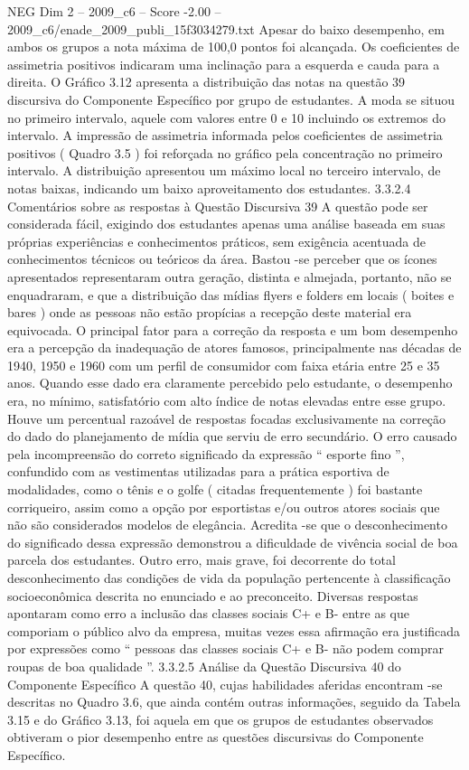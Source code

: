 \begin{textsample}{NEG Dim 2 – 2009\_c6 – Score -2.00 – 2009\_c6/enade\_2009\_publi\_15f3034279.txt}
Apesar do baixo desempenho, em ambos os grupos a nota máxima de 100,0 pontos foi alcançada.
Os coeficientes de assimetria positivos indicaram uma inclinação para a esquerda e cauda para a direita.
O Gráfico 3.12 apresenta a distribuição das notas na questão 39 discursiva do Componente Específico por grupo de estudantes.
A moda se situou no primeiro intervalo, aquele com valores entre 0 e 10 incluindo os extremos do intervalo.
A impressão de assimetria informada pelos coeficientes de assimetria positivos ( Quadro 3.5 ) foi reforçada no gráfico pela concentração no primeiro intervalo.
A distribuição apresentou um máximo local no terceiro intervalo, de notas baixas, indicando um baixo aproveitamento dos estudantes. 3.3.2.4 Comentários sobre as respostas à Questão Discursiva 39 A questão pode ser considerada fácil, exigindo dos estudantes apenas uma análise baseada em suas próprias experiências e conhecimentos práticos, sem exigência acentuada de conhecimentos técnicos ou teóricos da área.
Bastou -se perceber que os ícones apresentados representaram outra geração, distinta e almejada, portanto, não se enquadraram, e que a distribuição das mídias flyers e folders em locais ( boites e bares ) onde as pessoas não estão propícias a recepção deste material era equivocada.
O principal fator para a correção da resposta e um bom desempenho era a percepção da inadequação de atores famosos, principalmente nas décadas de 1940, 1950 e 1960 com um perfil de consumidor com faixa etária entre 25 e 35 anos.
Quando esse dado era claramente percebido pelo estudante, o desempenho era, no mínimo, satisfatório com alto índice de notas elevadas entre esse grupo.
Houve um percentual razoável de respostas focadas exclusivamente na correção do dado do planejamento de mídia que serviu de erro secundário.
O erro causado pela incompreensão do correto significado da expressão “ esporte fino ”, confundido com as vestimentas utilizadas para a prática esportiva de modalidades, como o tênis e o golfe ( citadas frequentemente ) foi bastante corriqueiro, assim como a opção por esportistas e/ou outros atores sociais que não são considerados modelos de elegância.
Acredita -se que o desconhecimento do significado dessa expressão demonstrou a dificuldade de vivência social de boa parcela dos estudantes.
Outro erro, mais grave, foi decorrente do total desconhecimento das condições de vida da população pertencente à classificação socioeconômica descrita no enunciado e ao preconceito.
Diversas respostas apontaram como erro a inclusão das classes sociais C+ e B- entre as que comporiam o público alvo da empresa, muitas vezes essa afirmação era justificada por expressões como “ pessoas das classes sociais C+ e B- não podem comprar roupas de boa qualidade ”. 3.3.2.5 Análise da Questão Discursiva 40 do Componente Específico A questão 40, cujas habilidades aferidas encontram -se descritas no Quadro 3.6, que ainda contém outras informações, seguido da Tabela 3.15 e do Gráfico 3.13, foi aquela em que os grupos de estudantes observados obtiveram o pior desempenho entre as questões discursivas do Componente Específico.

\end{textsample}
